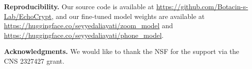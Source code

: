 
\noindent \textbf{Reproducibility.} Our source code is available at \url{https://github.com/Botacin-s-Lab/EchoCrypt}, and our fine-tuned model weights are available at \url{https://huggingface.co/seyyedaliayati/zoom_model} and \url{https://huggingface.co/seyyedaliayati/phone_model}.

\noindent \textbf{Acknowledgments.} We would like to thank the NSF for the support via the CNS 2327427 grant.